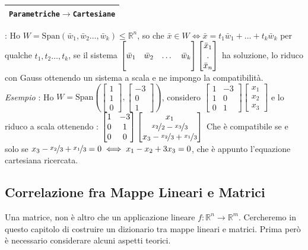 \documentclass[12pt, letterpaper]{article}
\newcommand{\R}{{\mathbb R}}
\newcommand{\Span}{{\text{Span}}}
\newcommand{\boxedMath}[1]{\begin{tabular}{|c|}\hline \texttt{#1} \\ \hline\end{tabular} :}
\begin{document}
\boxedMath{Parametriche\(\rightarrow\)Cartesiane} Ho \(W=\Span(\bar w_1,\bar w_2\dots,\bar w_k)\le \R^n\), so che 
\(\bar x \in W\iff \bar x = t_1\bar w_1+\dots + t_k\bar w_k\) per qualche \(t_1,t_2\dots,t_k\), se il sistema 
\(\begin{bmatrix}
    \hphantom{}&\hphantom{}&\hphantom{}&\hphantom{}\\
    \bar w_1&\bar w_2&\dots&\bar w_k\\
    \hphantom{}&\hphantom{}&\hphantom{}&\hphantom{}
\end{bmatrix}\begin{bmatrix}
    \bar x_1\\.\\\bar x_n
\end{bmatrix}\) ha soluzione, lo riduco con Gauss ottenendo un sistema a scala e ne impongo la compatibilità. \\ 
\textit{Esempio }: Ho \(W=\Span(\begin{bmatrix}
1\\1\\0
\end{bmatrix},\begin{bmatrix}
    -3\\0\\1
\end{bmatrix})\), considero \(
\begin{bmatrix}
    1&-3\\1&0\\0&1
\end{bmatrix}\begin{bmatrix}
    x_1\\x_2\\x_3
\end{bmatrix}    
\) e lo riduco a scala ottenendo : \(
    \begin{bmatrix}
        1&-3\\0&1\\0&0
    \end{bmatrix}\begin{bmatrix}
        x_1\\\nicefrac{x_2}{2}-\nicefrac{x_3}{3}\\x_3-\nicefrac{x_2}{3}+\nicefrac{x_1}{3}
    \end{bmatrix}    
    \)
    Che è compatibile se e solo se \(x_3-\nicefrac{x_2}{3}+\nicefrac{x_1}{3}=0\iff x_1-x_2+3x_3=0\), che è appunto l'equazione 
    cartesiana ricercata.
\subsection{Correlazione fra Mappe Lineari e Matrici}
Una matrice, non è altro che un applicazione lineare \(f:\R^n\rightarrow \R^m\). Cercheremo in questo capitolo di costruire un
dizionario tra mappe lineari e matrici. Prima però è necessario considerare alcuni aspetti teorici.
\end{document}
